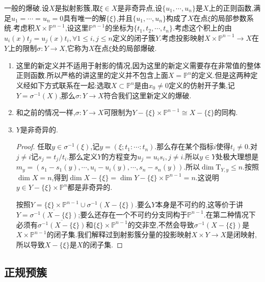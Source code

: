 一般的爆破.设$X$是拟射影簇,取$\xi\in X$是非奇异点,设$\{u_1,\cdots,u_n\}$是$X$上的正则函数,满足$u_1=\cdots=u_n=0$具有唯一的解$\{\xi\}$,并且$\{u_1,\cdots,u_n\}$构成了$X$在点$\xi$的局部参数系统.考虑积$X\times\mathbb{P}^{n-1}$,设这里$\mathbb{P}^{n-1}$的坐标为$\{t_1,t_2,\cdots,t_n\}$.考虑这个积上的由$u_i(x)t_j=u_j(x)t_i,\forall 1\le i,j\le n$定义的闭子簇$Y$.考虑投影映射$X\times\mathbb{P}^{n-1}\to X$在$Y$上的限制$\sigma:Y\to X$,它称为$X$在点$\xi$处的局部爆破.
\begin{enumerate}
	\item 这里的新定义并不适用于射影的情况,因为这里的新定义需要存在非常值的整体正则函数.所以严格的讲这里的定义并不包含上面$X=\mathbb{P}^n$的定义.但是这两种定义经如下方式联系在一起:选取$X\subset\mathbb{P}^n$是由$x_0\not=0$定义的仿射开子集,记$Y=\sigma^{-1}(X)$,那么$\sigma:Y\to X$符合我们这里新定义的爆破.
	\item 和之前的情况一样,$\sigma:Y\to X$可限制为$Y-\{\xi\}\times\mathbb{P}^{n-1}\cong X-\{\xi\}$的同构.
	\item $Y$是非奇异的.
	\begin{proof}
		
		任取$y\in\sigma^{-1}(\xi)$,记$y=(\xi;t_1:\cdots:t_n)$.那么存在某个指标$i$使得$t_i\not=0$.对$j\not=i$记$s_j=t_j/t_i$.那么定义$Y$的方程变为$u_j=u_is_i,j\not=i$.所以$y\in Y$处极大理想是$m_y=(s_1-s_1(y),\cdots,u_i-u_i(y),\cdots,s_n-s_n(y))$.所以$\dim\mathrm{T}_{Y,y}\le n$.按照$\dim X=n$,得到$\dim X-\{\xi\}=\dim Y-\{\xi\}\times\mathbb{P}^{n-1}=n$.这说明$y\in Y-\{\xi\}\times\mathbb{P}^n$都是非奇异的.
		
		按照$Y=\{\xi\}\times\mathbb{P}^{n-1}\cup\sigma^{-1}(X-\{\xi\})$.要么$Y$本身是不可约的,这等价于讲$Y=\overline{\sigma^{-1}(X-\{\xi\})}$;要么还存在一个不可约分支同构于$\mathbb{P}^{n-1}$.在第二种情况下必须有$\overline{\sigma^{-1}(X-\{\xi\})}$和$\{\xi\}\times\mathbb{P}^{n-1}$的交非空,不然会导致$\sigma^{-1}(X-\{\xi\})$是$X\times\mathbb{P}^{n-1}$的闭子集.我们解释过到射影簇分量的投影映射$X\times Y\to X$是闭映射,所以导致$X-\{\xi\}$是$X$的闭子集.
		
		
	\end{proof}
\end{enumerate}









\newpage
\subsection{正规预簇}

